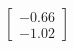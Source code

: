 \documentclass[preview]{standalone}
\begin{document}
\begin{align*}
\begin{bmatrix} -0.66 \\ -1.02 \end{bmatrix}
\end{align*}
\end{document}

